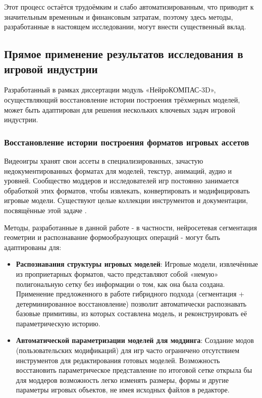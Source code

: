 Этот процесс остаётся трудоёмким и слабо автоматизированным, что приводит к значительным временным и финансовым затратам, поэтому здесь методы, разработанные в настоящем исследовании, могут внести существенный вклад.

\subsection{Прямое применение результатов исследования в игровой индустрии}

Разработанный в рамках диссертации модуль «НейроКОМПАС-3D», осуществляющий восстановление истории построения трёхмерных моделей, может быть адаптирован для решения нескольких ключевых задач игровой индустрии.

\subsubsection{Восстановление истории построения форматов игровых ассетов}

Видеоигры хранят свои ассеты в специализированных, зачастую недокументированных форматах для моделей, текстур, анимаций, аудио и уровней. Сообщество моддеров и исследователей игр постоянно занимается обработкой этих форматов, чтобы извлекать, конвертировать и модифицировать игровые модели. Существуют целые коллекции инструментов и документации, посвящённые этой задаче \cite{awesomeGameReversing}.

Методы, разработанные в данной работе - в частности, нейросетевая сегментация геометрии и распознавание формообразующих операций - могут быть адаптированы для:
\begin{itemize}
    \item \textbf{Распознавания структуры игровых моделей}: Игровые модели, извлечённые из проприетарных форматов, часто представляют собой «немую» полигональную сетку без информации о том, как она была создана. Применение предложенного в работе гибридного подхода (сегментация + детерминированное восстановление) позволит автоматически распознавать базовые примитивы, из которых составлена модель, и реконструировать её параметрическую историю.
    \item \textbf{Автоматической параметризации моделей для моддинга}: Создание модов (пользовательских модификаций) для игр часто ограничено отсутствием инструментов для редактирования готовых моделей. Возможность восстановить параметрическое представление по итоговой сетке открыла бы для моддеров возможность легко изменять размеры, формы и другие параметры игровых объектов, не имея исходных файлов в редакторе.
\end{itemize}

